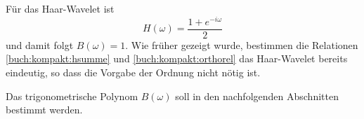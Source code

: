 \begin{beispiel}
Für das Haar-Wavelet ist
\[
H(\omega)
=
\frac{ 1+e^{-i\omega}}2
\]
und damit folgt $B(\omega)=1$.
Wie früher gezeigt wurde, bestimmen die Relationen 
\eqref{buch:kompakt:hsumme} und \eqref{buch:kompakt:orthorel}
das Haar-Wavelet bereits eindeutig, so dass die Vorgabe der Ordnung
nicht nötig ist.
\end{beispiel}

Das trigonometrische Polynom $B(\omega)$ soll in den nachfolgenden
Abschnitten bestimmt werden.


